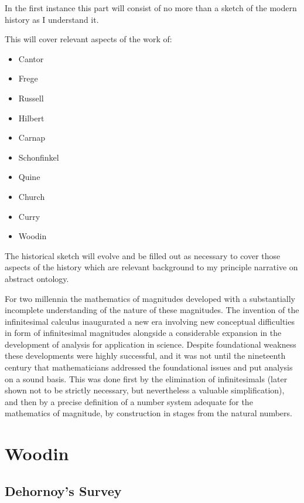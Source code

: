 
In the first instance this part will consist of no more than a sketch of the modern history as I understand it.

This will cover relevant aspects of the work of:

\begin{itemize}
\item Cantor
\item Frege
\item Russell
\item Hilbert
\item Carnap
\item Schonfinkel
\item Quine
\item Church
\item Curry
\item Woodin
\end{itemize}

The historical sketch will evolve and be filled out as necessary to cover those aspects of the history which are relevant background to my principle narrative on abstract ontology.

For two millennia the mathematics of magnitudes developed with a substantially incomplete understanding of the nature of these magnitudes.
The invention of the infinitesimal calculus inaugurated a new era involving new conceptual difficulties in form of infinitesimal magnitudes alongside a considerable expansion in the development of analysis for application in science.
Despite foundational weakness these developments were highly successful, and it was not until the nineteenth century that mathematicians addressed the foundational issues and put analysis on a sound basis.
This was done first by the elimination of infinitesimals (later shown not to be strictly necessary, but nevertheless a valuable simplification), and then by a precise definition of a number system adequate for the mathematics of magnitude, by construction in stages from the natural numbers.

\section{Woodin}

\subsection{Dehornoy's Survey}

